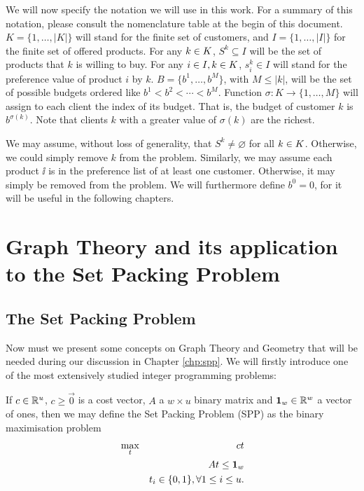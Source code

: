 We will now specify the notation we will use in this work. For a summary of this
notation, please consult the nomenclature table at the begin of this document.
$K = \{ 1, \ldots, |K| \}$ will stand for the finite set of customers, and $I =
\{ 1, \ldots, |I| \}$ for the finite set of offered products. For any ${k \in K}$,
$S^k \subseteq I$ will be the set of products that $k$ is willing to buy. For
any ${i \in I}, {k \in K}$, $s_i^k \in I$ will stand for the preference value of product $i$
by $k$. $B = \{ b^1, \ldots, b^M \}$, with $M \leq |k|$, will be the set of
possible budgets ordered like $b^1 < b^2 < \cdots < b^M$. Function $\sigma: K
\to \{1, \ldots, M\}$ will assign to each client the index of its budget. That
is, the budget of customer $k$ is $b^{\sigma(k)}$. Note that clients $k$ with a
greater value of $\sigma(k)$ are the richest.

We may assume, without loss of generality, that $S^k \neq \varnothing$ for all
${k \in K}$. Otherwise, we could simply remove $k$ from the problem. Similarly, we may
assume each product $\ii$ is in the preference list of at least one customer.
Otherwise, it may simply be removed from the problem. We will furthermore define
$b^0 = 0$, for it will be useful in the following chapters.

\section{Graph Theory and its application to the Set Packing Problem} %
\label{sec:int:graph-theory-and-spp}

\subsection{The Set Packing Problem}

Now must we present some concepts on Graph Theory and Geometry that will be
needed during our discussion in Chapter \ref{chp:spp}. We will firstly introduce
one of the most extensively studied integer programming problems:

\begin{definition}
    \label{def:spp}
    
    If $c \in {\ensuremath{\mathbb{R}}}^u$, $c \geq \vec{0}$ is a cost vector, $A$ a $w \times u$
    binary matrix and $\textbf{1}_w \in {\ensuremath{\mathbb{R}}}^w$ a vector of ones, then we may
    define the Set Packing Problem (SPP) as the binary maximisation problem
    \begin{eqnarray*}
        &\max_t
            & ct\\
        &   & At \leq \mathbf{1}_w\\
        &   & t_i \in {\ensuremath{\{ 0, 1 \}}}, \forall 1 \leq i \leq u.
    \end{eqnarray*}
\end{definition}

